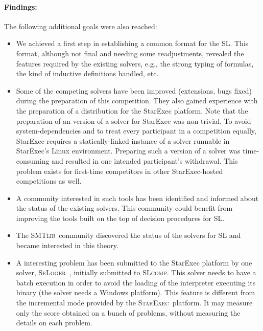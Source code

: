 \documentclass[twoside,11pt]{article}
\newcommand{\smtlib}{\textsc{SMTlib}}
\newcommand{\slcomp}{\textsc{SLcomp}}
\newcommand{\starexec}{\textsc{StarExec}}
\begin{document}
\paragraph{Findings:}
The following additional goals were also reached:
\begin{itemize}
\item We achieved a first step in establishing a common format for the SL. 
This format, although not final and needing some readjustments, revealed the features required by the existing solvers, e.g., the strong typing of formulas, the kind of inductive definitions handled, etc.

\item Some of the competing solvers have been improved (extensions, bugs fixed) during the preparation of this competition. They also gained experience with the preparation of a distribution for the StarExec platform. Note that the preparation of an version of a solver for StarExec was non-trivial. To avoid system-dependencies and to treat every participant in a competition equally, StarExec requires a 
statically-linked instance of a solver runnable in StarExec's Linux environment. Preparing such a version
of a solver was time-consuming and resulted in one intended participant's withdrawal. This problem
exists for first-time competitors in other StarExec-hosted competitions as well.

\item A community interested in such tools has been identified and informed about the status of the existing solvers. This community could benefit from improving the tools built on the top of decision procedures for SL.

\item The \smtlib\ community discovered the status of the solvers for SL and became interested in this theory.

\item A interesting problem has been submitted to the StarExec platform by one solver, \textsc{SeLoger}~\cite{HasseIOP13}, initially submitted to \slcomp. This solver needs to have a batch execution in order to avoid the loading of the interpreter executing its binary (the solver needs a Windows platform).
This feature is different from the incremental mode provided by the \starexec\ platform. It may measure only the score obtained on a bunch of problems, without measuring the details on each problem. 
 
\end{itemize}
\end{document}
